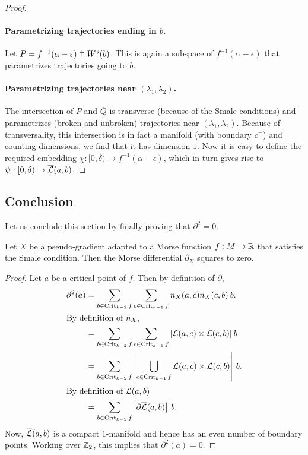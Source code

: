 \begin{proof}
    \paragraph{Parametrizing trajectories ending in $b$.}
    Let $P = f^{-1}(\alpha - \varepsilon) \pitchfork W^s(b)$.
    This is again a subspace of $f^{-1}(\alpha-\epsilon)$ that parametrizes trajectories going to $b$.

    \paragraph{Parametrizing trajectories near $(\lambda_1, \lambda_2)$.}
    The intersection of $P$ and  $\overline{Q}$ is transverse (because of the Smale conditions) and parametrizes (broken and unbroken) trajectories near $(\lambda_1, \lambda_2)$.
    Because of transversality, this intersection is in fact a manifold (with boundary $c^{-}$) and counting dimensions, we find that it has dimension $1$.
    Now it is easy to define the required embedding $\chi: [0, \delta) \to  f^{-1}(\alpha-\epsilon)$, which in turn gives rise to $\psi: [0, \delta) \to  \overline{\mathcal L}(a, b)$.

\end{proof}
\subsection{Conclusion}

Let us conclude this section by finally proving that $\partial^2 = 0$.
\begin{theorem}
    Let $X$ be a pseudo-gradient adapted to a Morse function  $f: M \to  \mathbb{R}$ that satisfies the Smale condition.
    Then the Morse differential $\partial_X$ squares to zero.
\end{theorem}
\begin{proof}
    Let $a$ be a critical point of $f$.
    Then by definition of $\partial$,
    \begin{align*}
        \partial^2(a)
        &= 
        \sum_{b \in  \operatorname{Crit}_{k-2}f}
        \sum_{c \in  \operatorname{Crit}_{k-1}f}
        n_X(a, c) n_X(c, b) \: b.\\
        \shortintertext{By definition of $n_X$,}
        &= 
        \sum_{b \in  \operatorname{Crit}_{k-2}f}
        \sum_{c \in  \operatorname{Crit}_{k-1}f}
        |\mathcal L(a, c) \times \mathcal L(c, b) |\:  b\\
        &= 
        \sum_{b \in  \operatorname{Crit}_{k-2}f}
        \left| \bigcup_{c \in  \operatorname{Crit}_{k-1}f}
        \mathcal L(a, c) \times \mathcal L(c, b) \right|\:  b.\\
        \shortintertext{By definition of $\overline{\mathcal L}(a, b)$}
        &= \sum_{b \in  \operatorname{Crit}_{k-2}f} \left|\partial \overline{\mathcal L}(a, b) \right|\:  b.
    \end{align*} 
    Now, $\overline{\mathcal L}(a, b)$ is a compact  $1$-manifold and hence has an even number of boundary points. Working over $ \mathbb{Z}_2$, this implies that $\partial^2(a) = 0$.
\end{proof}

